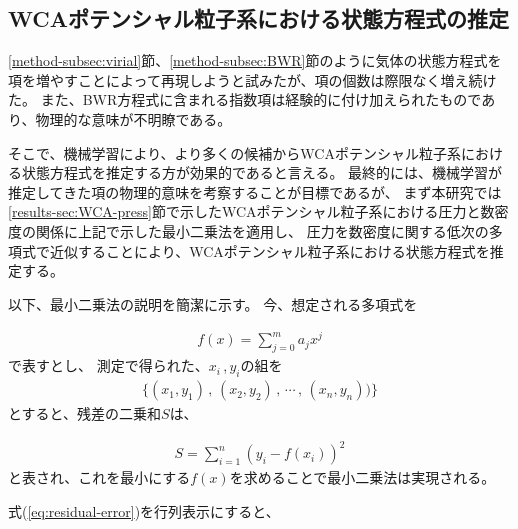 \documentclass[titlepage]{jsreport}
\begin{document}
{{{\subsection{WCAポテンシャル粒子系における状態方程式の推定}\label{method-subsec:WCA-equation}
\ref{method-subsec:virial}節、\ref{method-subsec:BWR}節のように気体の状態方程式を項を増やすことによって再現しようと試みたが、項の個数は際限なく増え続けた。
また、BWR方程式に含まれる指数項は経験的に付け加えられたものであり、物理的な意味が不明瞭である。

そこで、機械学習により、より多くの候補からWCAポテンシャル粒子系における状態方程式を推定する方が効果的であると言える。
最終的には、機械学習が推定してきた項の物理的意味を考察することが目標であるが、
まず本研究では\ref{results-sec:WCA-press}節で示したWCAポテンシャル粒子系における圧力と数密度の関係に上記で示した最小二乗法を適用し、
圧力を数密度に関する低次の多項式で近似することにより、WCAポテンシャル粒子系における状態方程式を推定する。

以下、最小二乗法の説明を簡潔に示す。
今、想定される多項式を

\large
\begin{eqnarray}
f(x)=\sum_{j=0}^m a_jx^j \nonumber
\end{eqnarray}
\normalsize
で表すとし、
測定で得られた、$x_i$\,,\,$y_i$の組を
\large
\begin{eqnarray}
\{(x_1,y_1)\,,\,(x_2,y_2)\,,\,\cdots\,,\,(x_n,y_n)) \}\nonumber
\end{eqnarray}
\normalsize
とすると、残差の二乗和$S$は、

\large
\begin{eqnarray}
S=\sum_{i=1}^n (y_i-f(x_i))^2\label{eq:residual-error}
\end{eqnarray}
\normalsize
と表され、これを最小にする$f(x)$を求めることで最小二乗法は実現される。


式(\ref{eq:residual-error})を行列表示にすると、

}}}
\end{document}
